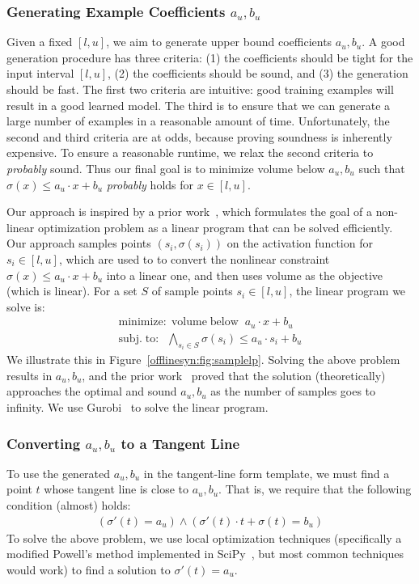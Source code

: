 \subsubsection{Generating Example Coefficients $ a_u, b_u $}
Given a fixed $ [l, u] $, we aim to generate upper bound coefficients $ a_u,
b_u $. A good generation procedure has three criteria: (1) the coefficients
should be tight for the input interval $ [l, u] $, (2) the coefficients should
be sound, and (3)
the generation should be fast. The first two criteria are intuitive: good training examples
will result in a good learned model. The third is to ensure that we can
generate a large number of examples in a reasonable amount of time.
Unfortunately, the second and third criteria are at odds, because proving
soundness is inherently expensive. To ensure a reasonable runtime, we relax the
second criteria to \textit{probably} sound. Thus our final goal is to minimize
volume below $ a_u, b_u $ such that $ \sigma(x) \leq a_u\cdot x + b_u $
\textit{probably} holds for $ x \in [l, u] $.

Our approach is inspired by a prior
work~\cite{ryou2021scalable,balunovic2019certifying}, which formulates the goal of a non-linear optimization problem
as a linear program that can be solved efficiently. Our approach samples points
$ (s_i, \sigma(s_i)) $ on the activation function for  $ s_i \in [l, u] $,
which are used to to convert the nonlinear constraint $ \sigma(x) \leq a_u\cdot
x + b_u $ into a linear one, and then uses volume as the objective (which is
linear). For a set $ S $ of sample points $ s_i \in [l, u] $, the
linear program we solve is:
\begin{gather*}
	\mathrm{minimize:} \; \mathrm{volume \;below}\;\; a_u\cdot x + b_u \\
	\mathrm{subj.\; to:} \;\; \bigwedge_{s_i \in S}
	\sigma(s_i) \leq a_u\cdot s_i + b_u
\end{gather*}
We illustrate this in Figure~\ref{offlinesyn:fig:samplelp}.
Solving the above problem results in $ a_u, b_u $, and the prior
work~\cite{ryou2021scalable,balunovic2019certifying} proved that the solution
(theoretically) approaches the optimal and sound $ a_u, b_u $ as the number of
samples goes to infinity. We use Gurobi~\cite{gurobi} to solve the linear
program.

\subsubsection{Converting $ a_u, b_u $ to a Tangent Line}
To use the generated $ a_u, b_u $ in the tangent-line form template,
we must find a point $ t $ whose tangent line is close to $ a_u, b_u $.
That is, we require that the following condition (almost) holds:
\begin{gather*}
	(\sigma'(t) = a_u) \wedge (\sigma'(t)\cdot t + \sigma(t) = b_u)
\end{gather*}
To solve the above problem, we use local optimization techniques (specifically a
modified Powell's method \cite{powell1964efficient} implemented in
SciPy~\cite{2020SciPy-NMeth}, but most common techniques would work) to find a
solution to $ \sigma'(t) = a_u $.


